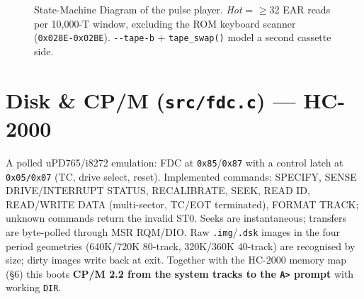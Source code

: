 \documentclass[11pt,a4paper]{article}
\begin{document}
\begin{figure}[h]\centering
{}
\caption{State-Machine Diagram of the pulse player. \emph{Hot} = $\geq$32 EAR
reads per 10{,}000-T window, excluding the ROM keyboard scanner
(\texttt{0x028E-0x02BE}). \texttt{-{}-tape-b} + \texttt{tape\_swap()} model a
second cassette side.}
\end{figure}

\section{Disk \& CP/M (\texttt{src/fdc.c}) --- HC-2000}

A polled uPD765/i8272 emulation: FDC at \texttt{0x85}/\texttt{0x87} with a
control latch at \texttt{0x05/0x07} (TC, drive select, reset). Implemented
commands: SPECIFY, SENSE DRIVE/INTERRUPT STATUS, RECALIBRATE, SEEK, READ ID,
READ/WRITE DATA (multi-sector, TC/EOT terminated), FORMAT TRACK; unknown
commands return the invalid ST0. Seeks are instantaneous; transfers are
byte-polled through MSR RQM/DIO. Raw \texttt{.img}/\texttt{.dsk} images in the
four period geometries (640K/720K 80-track, 320K/360K 40-track) are recognised
by size; dirty images write back at exit. Together with the HC-2000 memory map
(\S6) this boots \textbf{CP/M 2.2 from the system tracks to the \texttt{A>}
prompt} with working \texttt{DIR}.
\end{document}
